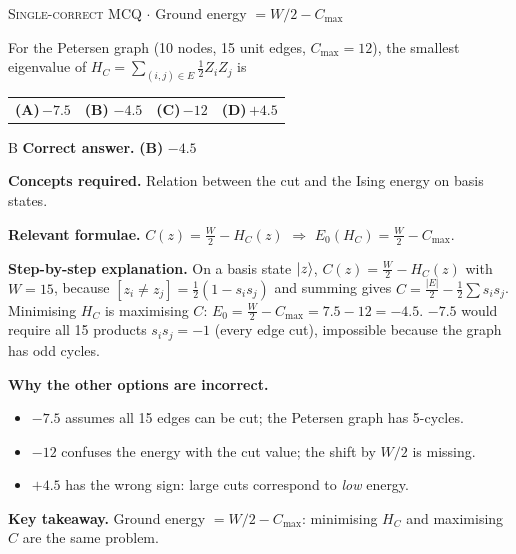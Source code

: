 \documentclass[11pt,a4paper]{article}
\newcommand{\optlabel}[1]{\textbf{(#1)}}
\newcommand{\correctlabel}[1]{\textcolor{okgreen}{\textbf{(#1)}\,\ding{51}}}
\newenvironment{qitem}[1]{\begin{list}{}{\setlength{\leftmargin}{3.3em}\setlength{\labelwidth}{3.1em}%
  \setlength{\labelsep}{0.2em}\setlength{\topsep}{3pt}\setlength{\parsep}{3pt}}\item[\textbf{Q.#1}\hfill]}{\end{list}}
\newcommand{\qsep}{\par\vspace{2pt}{\color{black!15}\hrule}\vspace{4pt}}
\newcommand{\qmeta}[2]{{\footnotesize\color{black!60}\textsc{#1} \;$\cdot$\; #2}\par}
\begin{document}
\begin{qitem}{19}
\qmeta{Single-correct MCQ}{Ground energy $= W/2 - C_{\max}$}
For the Petersen graph (10 nodes, 15 unit edges, $C_{\max} = 12$), the smallest eigenvalue of
$H_C = \sum_{(i,j)\in E}\tfrac12 Z_iZ_j$ is
\par\smallskip\noindent\begin{tabularx}{\linewidth}{@{}*{4}{L}@{}}
\optlabel{A}\,$-7.5$ & \correctlabel{B}\,$-4.5$ & \optlabel{C}\,$-12$ & \optlabel{D}\,$+4.5$
\end{tabularx}
\end{qitem}
\begin{solbox}{B}
\textbf{\color{brand}Correct answer.} \textcolor{okgreen}{\textbf{(B)}} $-4.5$

\textbf{\color{brand}Concepts required.} Relation between the cut and the Ising energy on basis states.

\textbf{\color{brand}Relevant formulae.} $C(z) = \tfrac W2 - H_C(z)$ $\Rightarrow$ $E_0(H_C) = \tfrac W2 - C_{\max}$.

\textbf{\color{brand}Step-by-step explanation.} On a basis state $\ket z$, $C(z) = \tfrac W2 - H_C(z)$ with $W = 15$, because
$[z_i \neq z_j] = \tfrac12(1 - s_is_j)$ and summing gives $C = \tfrac{|E|}{2} - \tfrac12\sum s_is_j$.
Minimising $H_C$ is maximising $C$: $E_0 = \tfrac W2 - C_{\max} = 7.5 - 12 = -4.5$.
$-7.5$ would require all 15 products $s_is_j = -1$ (every edge cut), impossible because the graph has odd cycles.

\textbf{\color{brand}Why the other options are incorrect.}
\begin{itemize}[leftmargin=2.4em, itemsep=1pt, topsep=2pt]
\item[\textbf{(A)}] $-7.5$ assumes all 15 edges can be cut; the Petersen graph has 5-cycles.
\item[\textbf{(C)}] $-12$ confuses the energy with the cut value; the shift by $W/2$ is missing.
\item[\textbf{(D)}] $+4.5$ has the wrong sign: large cuts correspond to \emph{low} energy.
\end{itemize}
\textbf{\color{brand}Key takeaway.} Ground energy $= W/2 - C_{\max}$: minimising $H_C$ and maximising $C$ are the same problem.
\end{solbox}
\qsep
\end{document}
